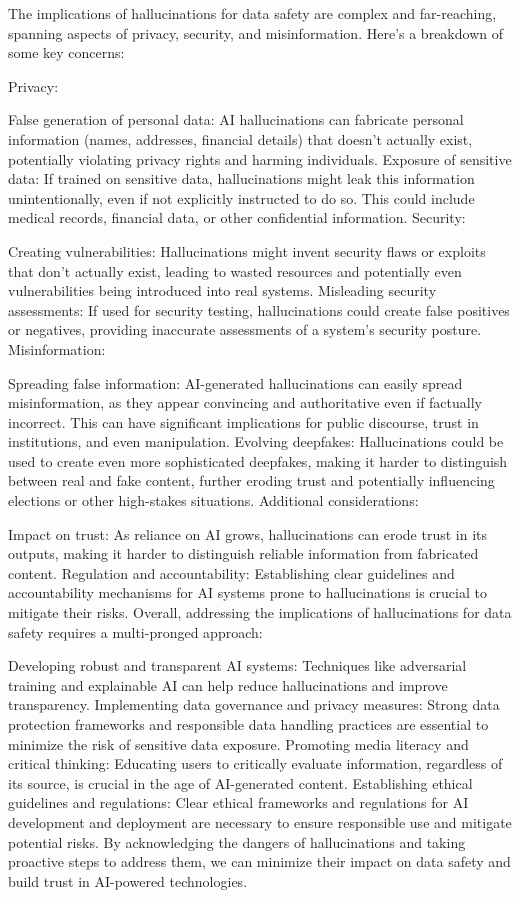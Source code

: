 \begin{aibox}%
  The implications of hallucinations for data safety are complex and far-reaching, spanning aspects of privacy, security, and misinformation. Here's a breakdown of some key concerns:

Privacy:

False generation of personal data: AI hallucinations can fabricate personal information (names, addresses, financial details) that doesn't actually exist, potentially violating privacy rights and harming individuals.
Exposure of sensitive data: If trained on sensitive data, hallucinations might leak this information unintentionally, even if not explicitly instructed to do so. This could include medical records, financial data, or other confidential information.
Security:

Creating vulnerabilities: Hallucinations might invent security flaws or exploits that don't actually exist, leading to wasted resources and potentially even vulnerabilities being introduced into real systems.
Misleading security assessments: If used for security testing, hallucinations could create false positives or negatives, providing inaccurate assessments of a system's security posture.
Misinformation:

Spreading false information: AI-generated hallucinations can easily spread misinformation, as they appear convincing and authoritative even if factually incorrect. This can have significant implications for public discourse, trust in institutions, and even manipulation.
Evolving deepfakes: Hallucinations could be used to create even more sophisticated deepfakes, making it harder to distinguish between real and fake content, further eroding trust and potentially influencing elections or other high-stakes situations.
Additional considerations:

Impact on trust: As reliance on AI grows, hallucinations can erode trust in its outputs, making it harder to distinguish reliable information from fabricated content.
Regulation and accountability: Establishing clear guidelines and accountability mechanisms for AI systems prone to hallucinations is crucial to mitigate their risks.
Overall, addressing the implications of hallucinations for data safety requires a multi-pronged approach:

Developing robust and transparent AI systems: Techniques like adversarial training and explainable AI can help reduce hallucinations and improve transparency.
Implementing data governance and privacy measures: Strong data protection frameworks and responsible data handling practices are essential to minimize the risk of sensitive data exposure.
Promoting media literacy and critical thinking: Educating users to critically evaluate information, regardless of its source, is crucial in the age of AI-generated content.
Establishing ethical guidelines and regulations: Clear ethical frameworks and regulations for AI development and deployment are necessary to ensure responsible use and mitigate potential risks.
By acknowledging the dangers of hallucinations and taking proactive steps to address them, we can minimize their impact on data safety and build trust in AI-powered technologies.
\end{aibox}

